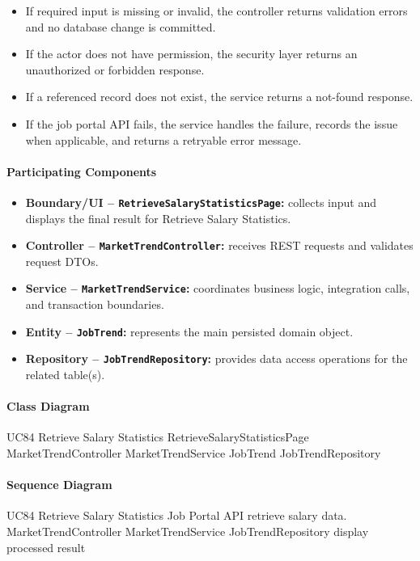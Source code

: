 \begin{itemize}
    \item If required input is missing or invalid, the controller returns validation errors and no database change is committed.
    \item If the actor does not have permission, the security layer returns an unauthorized or forbidden response.
    \item If a referenced record does not exist, the service returns a not-found response.
    \item If the job portal API fails, the service handles the failure, records the issue when applicable, and returns a retryable error message.
\end{itemize}

\paragraph{Participating Components}

\begin{itemize}
    \item \textbf{Boundary/UI -- \texttt{RetrieveSalaryStatisticsPage}:} collects input and displays the final result for Retrieve Salary Statistics.
    \item \textbf{Controller -- \texttt{MarketTrendController}:} receives REST requests and validates request DTOs.
    \item \textbf{Service -- \texttt{MarketTrendService}:} coordinates business logic, integration calls, and transaction boundaries.
    \item \textbf{Entity -- \texttt{JobTrend}:} represents the main persisted domain object.
    \item \textbf{Repository -- \texttt{JobTrendRepository}:} provides data access operations for the related table(s).
\end{itemize}

\paragraph{Class Diagram}

\ClassDiagram
{UC84 Retrieve Salary Statistics}
{RetrieveSalaryStatisticsPage}
{MarketTrendController}
{MarketTrendService}
{JobTrend}
{JobTrendRepository}

\paragraph{Sequence Diagram}

\SequenceDiagram
{UC84 Retrieve Salary Statistics}
{Job Portal API}
{retrieve salary data.}
{MarketTrendController}
{MarketTrendService}
{JobTrendRepository}
{display processed result}